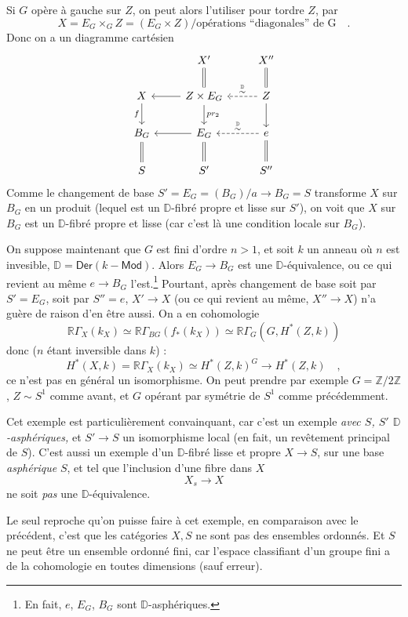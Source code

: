 \documentclass[11pt,leqno]{article}
\newcommand{\printedpage}[1]{\marginpar{\footnotesize p.~#1}}
\newcommand{\msp}[1]{\marginpar{\footnotesize [#1]}}
\newcommand{\D}{\mathbb{D}}
\newcommand{\RR}{\mathbb{R}}
\begin{document}
\printedpage{56}

\msp{page 91}
Si $G$ opère à gauche sur $Z$, on peut alors l'utiliser pour tordre $Z$, par
\[ X = E_G \times_G Z = (E_G \times Z)/\text{opérations ``diagonales'' de G} \quad . \]
Donc on a un diagramme cartésien
\[
\begin{tikzcd}
 & X' \arrow[d, equal] & X'' \arrow[d, equal] \\
X \arrow[d, "f"'] & Z \times E_G \arrow[l] \arrow[d, "pr_2"] & Z \arrow[l, dashed, "{\overset{\D}{\sim}}"'] \arrow[d] \\
B_G \arrow[d, equal] & E_G \arrow[l] \arrow[d, equal] & e \arrow[l, dashed, "{\overset{\D}{\sim}}"'] \arrow[d, equal] \\
S & S' & S''
\end{tikzcd}
\]
Comme le changement de base $S' = E_G = (B_G)/a \to B_G = S$ transforme $X$ sur $B_G$ en un produit (lequel est un $\D$-fibré propre et lisse sur $S'$), on voit que $X$ sur $B_G$ est un $\D$-fibré propre et lisse (car c'est là une condition locale sur $B_G$).

On suppose maintenant que $G$ est fini d'ordre $n > 1$, et soit $k$ un anneau où $n$ est invesible, $\D = \mathsf{Der}(k - \mathsf{Mod})$. Alors $E_G \to B_G$ est une $\D$-équivalence, ou ce qui revient au même $e \to B_G$ l'est.\footnote[47]{En fait, $e$, $E_G$, $B_G$ sont $\D$-asphériques.} Pourtant, après changement de base soit par $S' = E_G$, soit par $S'' = e$, $X' \to X$ (ou ce qui revient au même, $X'' \to X$) n'a guère de raison d'en être aussi. On a en cohomologie %
\[ \RR\Gamma_X(k_X) \simeq \RR\Gamma_{BG}(f_*(k_X)) \simeq \RR\Gamma_G(G, H^*(Z,k)) \]
\msp{page 92}
donc ($n$ étant inversible dans $k$) :
\[ H^*(X,k) = \RR\Gamma_X(k_X) \simeq H^*(Z,k)^G \longrightarrow H^*(Z,k) \quad , \]
ce n'est pas en général un isomorphisme. On peut prendre par exemple $G = \mathbb{Z}/2\mathbb{Z}$, $Z \sim S^1$ comme avant, et $G$ opérant par symétrie de $S^1$ comme précédemment.

Cet exemple est particulièrement convainquant, car c'est un exemple \textit{avec $S$, $S'$ $\D$-asphériques,} et $S' \to S$ un isomorphisme local (en fait, un revêtement principal de $S$). C'est aussi un exemple d'un $\D$-fibré lisse et propre $X \to S$, sur une base \textit{asphérique} $S$, et tel que l'inclusion d'une fibre dans $X$ %
\[ X_s \longrightarrow X \]
ne soit \textit{pas} une $\D$-équivalence.

Le seul reproche qu'on puisse faire à cet exemple, en comparaison avec le précédent, c'est que les catégories $X, S$ ne sont pas des ensembles ordonnés. Et $S$ ne peut être un ensemble ordonné fini, car l'espace classifiant d'un groupe fini a de la cohomologie en toutes dimensions (sauf erreur).
\end{document}
